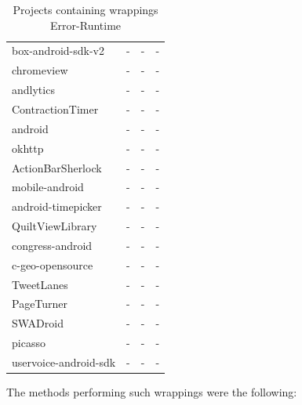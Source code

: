 \documentclass[conference]{IEEEtran}
\begin{document}
\begin{table}
\begin{tabular}{llll}
box-android-sdk-v2  &  -  &  -    & - \\
chromeview  &  -  &  -    & - \\
andlytics  &  -  &  -    & - \\
ContractionTimer  &  -  &  -    & - \\
android  &  -  &  -    & - \\
okhttp  &  -  &  -    & - \\
ActionBarSherlock  &  -  &  -    & - \\
mobile-android  &  -  &  -    & - \\
android-timepicker  &  -  &  -    & - \\
QuiltViewLibrary  &  -  &  -    & - \\
congress-android  &  -  &  -    & - \\
c-geo-opensource  &  -  &  -    & - \\
TweetLanes  &  -  &  -    & - \\
PageTurner  &  -  &  -    & - \\
SWADroid  &  -  &  -    & - \\
picasso  &  -  &  -    & - \\
uservoice-android-sdk  &  -  &  -    & - \\
\hline
  \end{tabular}
\caption{Projects containing wrappings Error-Runtime}
\label{tab:wrappings3}
\end{table}

The methods performing such wrappings were the following:

\end{document}

